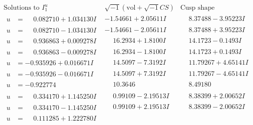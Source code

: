 \documentclass[1p]{elsarticle_modified}
\theoremstyle{definition}
\newcommand{\I}{\sqrt{-1}}
\begin{document}
$$\begin{array}{c|c|c}  
\text{Solutions to }I^u_{1}& \I (\text{vol} + \sqrt{-1}CS) & \text{Cusp shape}\\
 \hline 
\begin{aligned}
u &= \phantom{-}0.082710 + 1.034130 I\end{aligned}
 & -1.54661 + 2.05611 I & \phantom{-}8.37488 - 3.95223 I \\ \hline\begin{aligned}
u &= \phantom{-}0.082710 - 1.034130 I\end{aligned}
 & -1.54661 - 2.05611 I & \phantom{-}8.37488 + 3.95223 I \\ \hline\begin{aligned}
u &= \phantom{-}0.936863 + 0.009278 I\end{aligned}
 & \phantom{-}16.2934 + 1.8100 I & \phantom{-}14.1723 - 0.1493 I \\ \hline\begin{aligned}
u &= \phantom{-}0.936863 - 0.009278 I\end{aligned}
 & \phantom{-}16.2934 - 1.8100 I & \phantom{-}14.1723 + 0.1493 I \\ \hline\begin{aligned}
u &= -0.935926 + 0.016671 I\end{aligned}
 & \phantom{-}14.5097 - 7.3192 I & \phantom{-}11.79267 + 4.65141 I \\ \hline\begin{aligned}
u &= -0.935926 - 0.016671 I\end{aligned}
 & \phantom{-}14.5097 + 7.3192 I & \phantom{-}11.79267 - 4.65141 I \\ \hline\begin{aligned}
u &= -0.922774\phantom{ +0.000000I}\end{aligned}
 & \phantom{-}10.3646\phantom{ +0.000000I} & \phantom{-}8.49180\phantom{ +0.000000I} \\ \hline\begin{aligned}
u &= \phantom{-}0.334170 + 1.145250 I\end{aligned}
 & \phantom{-}0.99109 - 2.19513 I & \phantom{-}8.38399 + 2.00652 I \\ \hline\begin{aligned}
u &= \phantom{-}0.334170 - 1.145250 I\end{aligned}
 & \phantom{-}0.99109 + 2.19513 I & \phantom{-}8.38399 - 2.00652 I \\ \hline\begin{aligned}
u &= \phantom{-}0.111285 + 1.222780 I\end{aligned}

\end{array}$$
\end{document}

